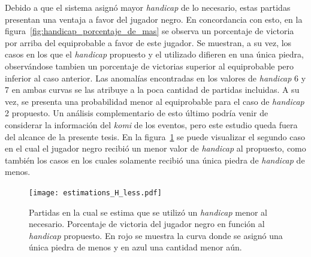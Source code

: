\documentclass[11pt,twoside, spanish]{report} %
\begin{document}
Debido a que el sistema asign\'o mayor \textit{handicap} de lo necesario,  estas partidas presentan una ventaja a favor del jugador negro.
En concordancia con esto, en la figura~\ref{fig:handicap_porcentaje_de_mas} se observa un porcentaje de victoria por arriba del equiprobable a favor de este jugador.
Se muestran, a su vez, los casos en los que el \textit{handicap} propuesto y el utilizado difieren en una \'unica piedra, observ\'andose tambien un porcentaje de victorias superior al equiprobable pero inferior al caso anterior.
Las anomal\'ias encontradas en los valores de \textit{handicap} 6 y 7 en ambas curvas se las atribuye a la poca cantidad de partidas incluidas.
A su vez, se presenta una probabilidad menor al equiprobable para el caso de \textit{handicap} 2 propuesto.
Un an\'alisis complementario de esto \'ultimo podr\'ia venir de considerar la informaci\'on del \textit{komi} de los eventos, pero este estudio queda fuera del alcance de la presente tesis.
En la figura~\ref{fig:handicap_porcentaje_de_menos} se puede visualizar el segundo caso en el cual el jugador negro recibi\'o un menor valor de \textit{handicap} al propuesto, como tambi\'en los casos en los cuales solamente recibi\'o una \'unica piedra de \textit{handicap} de menos.



\begin{figure}[H]
    \centering
    \texttt{[image: estimations\_H\_less.pdf]}
    \caption{Partidas en la cual se estima que se utiliz\'o un \textit{handicap} menor al necesario. Porcentaje de victoria del jugador negro en funci\'on al \textit{handicap} propuesto.  En rojo se muestra la curva donde se asign\'o  una \'unica piedra de menos  y en azul una cantidad menor a\'un.}
    \label{fig:handicap_porcentaje_de_menos}
\end{figure}
\end{document}
